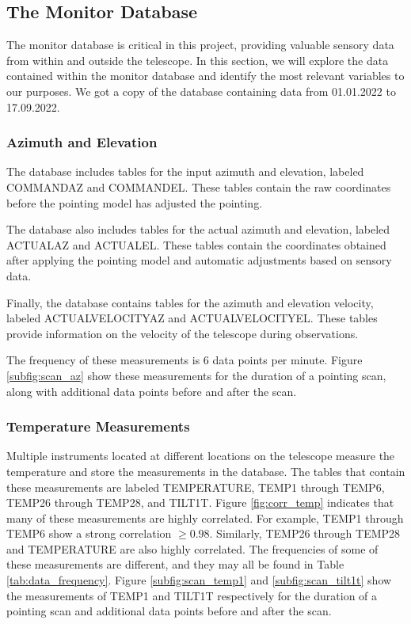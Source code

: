 \subsection{The Monitor Database}
The monitor database is critical in this project, providing valuable sensory data from within and outside the telescope.
In this section, we will explore the data contained within the monitor database and identify the most relevant variables to our purposes.
We got a copy of the database containing data from 01.01.2022 to 17.09.2022.

\subsubsection{Azimuth and Elevation}
The database includes tables for the input azimuth and elevation, labeled COMMANDAZ and COMMANDEL.
These tables contain the raw coordinates before the pointing model has adjusted the pointing.

The database also includes tables for the actual azimuth and elevation, labeled ACTUALAZ and ACTUALEL.
These tables contain the coordinates obtained after applying the pointing model and automatic adjustments based on sensory data.

Finally, the database contains tables for the azimuth and elevation velocity, labeled ACTUALVELOCITYAZ and ACTUALVELOCITYEL.
These tables provide information on the velocity of the telescope during observations.

The frequency of these measurements is $6$ data points per minute.
Figure \ref{subfig:scan_az} show these measurements for the duration of a pointing scan, along with additional data points before and after the scan.


\subsubsection{Temperature Measurements}
Multiple instruments located at different locations on the telescope measure the temperature and store the measurements in the database.
The tables that contain these measurements are labeled TEMPERATURE, TEMP1 through TEMP6, TEMP26 through TEMP28, and TILT1T. 
Figure \ref{fig:corr_temp} indicates that many of these measurements are highly correlated.
For example, TEMP1 through TEMP6 show a strong correlation $\geq 0.98$.
Similarly, TEMP26 through TEMP28 and TEMPERATURE are also highly correlated.
The frequencies of some of these measurements are different, and they may all be found in Table \ref{tab:data_frequency}.
Figure \ref{subfig:scan_temp1} and \ref{subfig:scan_tilt1t} show the measurements of TEMP1 and TILT1T respectively
for the duration of a pointing scan and additional data points before and after the scan.


